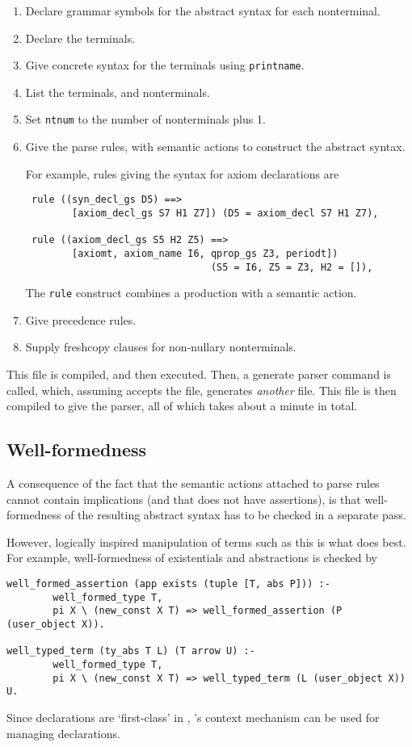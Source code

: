 \begin{enumerate}
\item Declare grammar symbols for the abstract syntax for each nonterminal.
\item Declare the terminals.
\item Give concrete syntax for the terminals using {\tt printname}.
\item List the terminals, and nonterminals.
\item Set {\tt ntnum} to the number of nonterminals plus 1.
\item
Give the parse rules, with semantic actions to construct
the abstract syntax.

For example, rules giving the syntax for axiom declarations are
\begin{verbatim}
 rule ((syn_decl_gs D5) ==> 
        [axiom_decl_gs S7 H1 Z7]) (D5 = axiom_decl S7 H1 Z7),

 rule ((axiom_decl_gs S5 H2 Z5) ==> 
        [axiomt, axiom_name I6, qprop_gs Z3, periodt]) 
                                (S5 = I6, Z5 = Z3, H2 = []),
\end{verbatim}
The {\tt rule} construct combines a production with a semantic action.
\item
Give precedence rules.
\item Supply freshcopy clauses for non-nullary nonterminals.
\end{enumerate}


This file is compiled, and then executed. Then, a generate parser
command is called, which, assuming \lyacc accepts the file, generates
{\em another} file. This file is then compiled to give the parser, all
of which takes about a minute in total.


\subsection{Well-formedness}\label{well-formedness}

A consequence of the fact that the semantic actions attached to \lyacc
parse rules cannot contain implications (and that \lprolog does not
have assertions), is that well-formedness of the resulting abstract
syntax has to be checked in a separate pass.

However, logically inspired manipulation of terms such as this is what
\lprolog does best.  For example, well-formedness of existentials and
abstractions is checked by
\begin{verbatim}
well_formed_assertion (app exists (tuple [T, abs P])) :-
        well_formed_type T,
        pi X \ (new_const X T) => well_formed_assertion (P (user_object X)). 

well_typed_term (ty_abs T L) (T arrow U) :-
        well_formed_type T,
        pi X \ (new_const X T) => well_typed_term (L (user_object X)) U.
\end{verbatim}
Since declarations are `first-class' in \lprolog, \lprolog's context
mechanism can be used for managing declarations.

